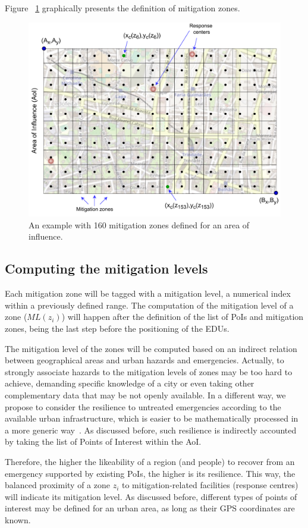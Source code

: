 \begin{refsection}
Figure ~\ref{Fig:figGrid} graphically presents the definition of mitigation zones.

\begin{figure}[htb!]
  \centering
  \includegraphics[width=0.77\linewidth]{Chapters/2-EDUs/images/MitigationZones.pdf}
  \caption{An example with 160 mitigation zones defined for an area of influence.}\label{Fig:figGrid}
\end{figure}

%
\subsection{Computing the mitigation levels}

Each mitigation zone will be tagged with a mitigation level, a numerical index within a previously defined range. The computation of the mitigation level of a zone ($ML(z_i)$) will happen after the definition of the list of PoIs and mitigation zones, being the last step before the positioning of the EDUs. 

The mitigation level of the zones will be computed based on an indirect relation between geographical areas and urban hazards and emergencies. Actually, to strongly associate hazards to the mitigation levels of zones may be too hard to achieve, demanding specific knowledge of a city or even taking other complementary data that may be not openly available. In a different way, we propose to consider the resilience to untreated emergencies according to the available urban infrastructure, which is easier to be mathematically processed in a more generic way~\cite{emergencies1}. As discussed before, such resilience is indirectly accounted by taking the list of Points of Interest within the AoI.

Therefore, the higher the likeability of a region (and people) to recover from an emergency supported by existing PoIs, the higher is its resilience. This way, the balanced proximity of a zone $z_i$ to mitigation-related facilities (response centres) will indicate its mitigation level. As discussed before, different types of points of interest may be defined for an urban area, as long as their GPS coordinates are known.


\end{refsection}
